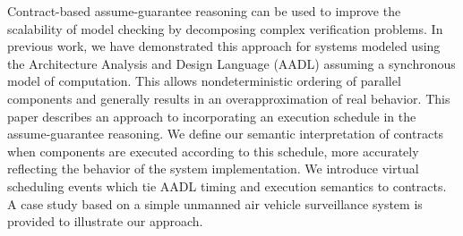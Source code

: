 Contract-based assume-guarantee reasoning can be used to improve the scalability of model checking
by decomposing complex verification problems.  In previous work, we have demonstrated this approach 
for systems modeled using the Architecture Analysis and Design Language (AADL) assuming a 
synchronous model of computation.  This allows nondeterministic ordering of parallel components
and generally results in an overapproximation of real behavior.  
This paper describes an
approach to incorporating an execution schedule in the assume-guarantee reasoning. We define our semantic
interpretation of contracts when components are executed according to this schedule, 
more accurately reflecting the behavior of the system implementation. 
We introduce virtual scheduling events which tie AADL timing and execution semantics to contracts. 
A case study based on a simple unmanned air vehicle surveillance system is provided to illustrate our approach.

